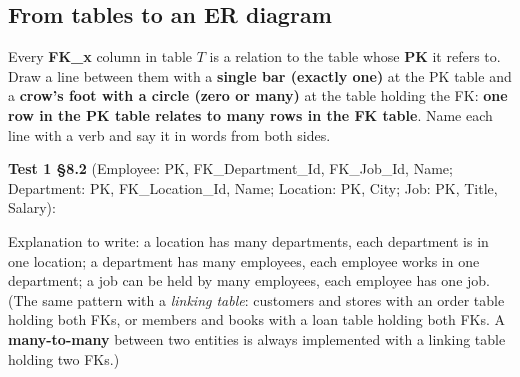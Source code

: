 \documentclass{fkt-notes}
\newcommand{\ertable}[4]{%
  \node[ertitle] (#1) at (#2) {#3};
  \draw (#1.south west) -- (#1.south east);
  \xdef\erprev{#1}%
  \foreach \k/\t in {#4} {%
    \node[errow, below=0pt of \erprev] (#1-\k) {\t};
    \xdef\erprev{#1-\k}%
  }
  \node[draw, fit=(#1)(\erprev), inner sep=0pt] {};
}
\newcommand{\erlink}[5]{%
  \coordinate (ermid) at ($(#1)!0.5!(#3)$);
  \draw (#1) -- (ermid |- #1) -- (ermid |- #3) -- (#3);
  \node[fill=white, inner sep=1.5pt, align=center,
    font=\sffamily\scriptsize] at (ermid) {#5};
  \draw ($(#1)+(#2*0.2,0.15)$) -- ($(#1)+(#2*0.2,-0.15)$);
  \draw ($(#1)+(#2*0.3,0.15)$) -- ($(#1)+(#2*0.3,-0.15)$);
  \draw ($(#3)+(#4*0.3,0)$) -- ($(#3)+(0,0.15)$);
  \draw ($(#3)+(#4*0.3,0)$) -- (#3);
  \draw ($(#3)+(#4*0.3,0)$) -- ($(#3)+(0,-0.15)$);
  \draw[fill=white] ($(#3)+(#4*0.45,0)$) circle (0.08);
}
\begin{document}
\subsection{From tables to an ER diagram}
\begin{rulebox}[title={Method: crow's foot from PK/FK}]
  Every \textbf{FK\_x} column in table $T$ is a relation to the table whose \textbf{PK} it refers to.
  Draw a line between them with a \textbf{single bar (exactly one)} at the PK table and a \textbf{crow's foot with a circle
    (zero or many)} at the table holding the FK: \textbf{one row in the PK table relates to many rows in the FK table}.
  Name each line with a verb and say it in words from both sides.
\end{rulebox}
\textbf{Test 1 \S8.2} (Employee: PK, FK\_Department\_Id, FK\_Job\_Id, Name; Department: PK, FK\_Location\_Id, Name;
Location: PK, City; Job: PK, Title, Salary):
\begin{center}
\end{center}
Explanation to write: a location has many departments, each department is in one location; a department has many
employees, each employee works in one department; a job can be held by many employees, each employee has one job.
(The same pattern with a \emph{linking table}: customers and stores with an order table holding both FKs, or members and books with
a loan table holding both FKs. A \textbf{many-to-many} between two entities is always implemented with a linking table holding two FKs.)
\end{document}
